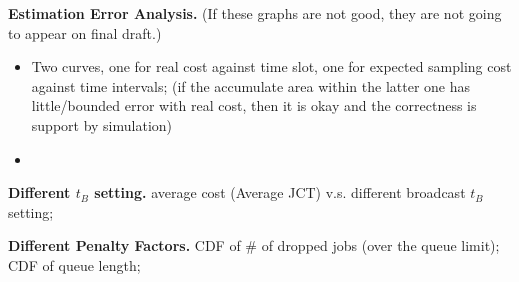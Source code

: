 \textbf{Estimation Error Analysis.}
(If these graphs are not good, they are not going to appear on final draft.)
\begin{itemize}
    \item Two curves, one for real cost against time slot, one for expected sampling cost against time intervals; (if the accumulate area within the latter one has little/bounded error with real cost, then it is okay and the correctness is support by simulation)
    \item 
\end{itemize}

\textbf{Different $t_B$ setting.}
    average cost (Average JCT) v.s. different broadcast $t_B$ setting;

\textbf{Different Penalty Factors.}
CDF of \# of dropped jobs (over the queue limit); CDF of queue length;